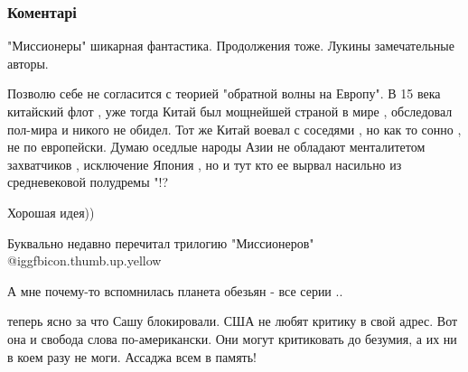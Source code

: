  
 
 
 
 
\subsubsection{Коментарі}

\begin{itemize} %
"Миссионеры" шикарная фантастика. Продолжения тоже. Лукины замечательные авторы.


Позволю себе не согласится с теорией "обратной волны на Европу". В 15 века
китайский флот , уже тогда Китай был мощнейшей страной в мире , обследовал
пол-мира и никого не обидел. Тот же Китай воевал с соседями , но как то сонно ,
не по европейски. Думаю оседлые народы Азии не обладают менталитетом
захватчиков , исключение Япония , но и тут кто ее вырвал насильно из
средневековой полудремы "!?

Хорошая идея))

Буквально недавно перечитал трилогию "Миссионеров" @igg{fbicon.thumb.up.yellow} 

А мне почему-то вспомнилась планета обезьян - все серии ..


теперь ясно за что Сашу блокировали. США не любят критику в свой адрес. Вот она
и свобода слова по-американски. Они могут критиковать до безумия, а их ни в
коем разу не моги. Ассаджа всем в память!

\end{itemize} %
